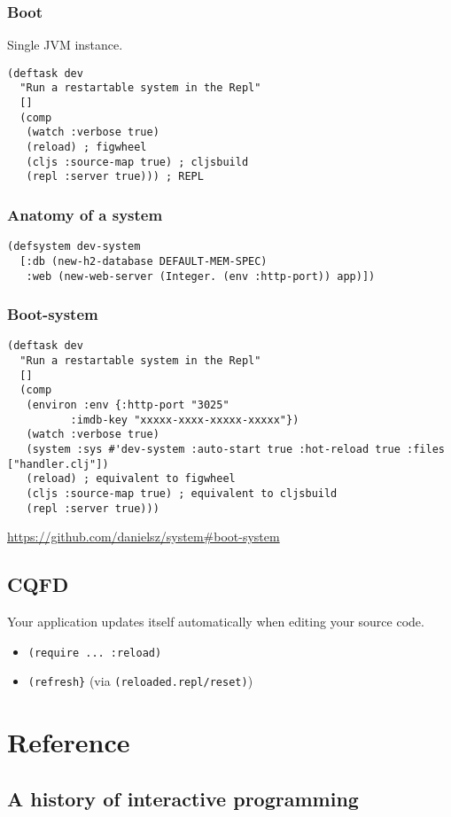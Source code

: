 \documentclass[11pt]{article}
\begin{document}
\subsubsection*{Boot}
\label{sec:orgheadline27}
Single JVM instance.
\begin{verbatim}
(deftask dev
  "Run a restartable system in the Repl"
  []
  (comp
   (watch :verbose true)  
   (reload) ; figwheel
   (cljs :source-map true) ; cljsbuild
   (repl :server true))) ; REPL
\end{verbatim}
\subsubsection*{Anatomy of a system}
\label{sec:orgheadline28}
\begin{verbatim}
(defsystem dev-system
  [:db (new-h2-database DEFAULT-MEM-SPEC)
   :web (new-web-server (Integer. (env :http-port)) app)])
\end{verbatim}
\subsubsection*{Boot-system}
\label{sec:orgheadline29}
\begin{verbatim}
(deftask dev
  "Run a restartable system in the Repl"
  []
  (comp
   (environ :env {:http-port "3025"
		  :imdb-key "xxxxx-xxxx-xxxxx-xxxxx"})
   (watch :verbose true)
   (system :sys #'dev-system :auto-start true :hot-reload true :files ["handler.clj"])
   (reload) ; equivalent to figwheel
   (cljs :source-map true) ; equivalent to cljsbuild
   (repl :server true)))
\end{verbatim}
\url{https://github.com/danielsz/system#boot-system}
\subsection*{CQFD}
\label{sec:orgheadline31}
Your application updates itself automatically when editing your source code.
\begin{itemize}
\item \texttt{(require ... :reload)}
\item \texttt{(refresh\}} (via \texttt{(reloaded.repl/reset)})
\end{itemize}
\section*{Reference}
\label{sec:orgheadline38}
\subsection*{A history of interactive programming}
\label{sec:orgheadline33}
\end{document}
